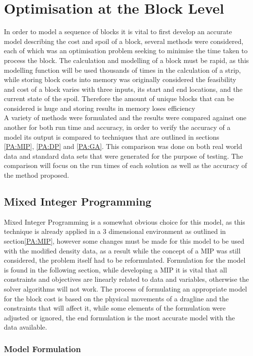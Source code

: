 \section{Optimisation at the Block Level}
In order to model a sequence of blocks it is vital to first develop an accurate model describing the cost and spoil of a block, several methods were considered, each of which was an optimisation problem seeking to minimise the time taken to process the block. The calculation and modelling of a block must be rapid, as this modelling function will be used thousands of times in the calculation of a strip, while storing block costs into memory was originally considered the feasibility and cost of a block varies with three inputs, its start and end locations, and the current state of the spoil. Therefore the amount of unique blocks that can be considered is huge and storing results in memory loses efficiency \\A variety of methods were formulated and the results were compared against one another for both run time and accuracy, in order to verify the accuracy of a model its output is compared to techniques that are outlined in sections \ref{PA:MIP}, \ref{PA:DP} and \ref{PA:GA}. This comparison was done on both real world data and standard data sets that were generated for the purpose of testing. The comparison will focus on the run times of each solution as well as the accuracy of the method proposed. 

\subsection{Mixed Integer Programming}
Mixed Integer Programming is a somewhat obvious choice for this model, as this technique is already applied in a 3 dimensional environment as outlined in section\ref{PA:MIP}, however some changes must be made for this model to be used with the modified density data, as a result while the concept of a MIP was still considered, the problem itself had to be reformulated. Formulation for the model is found in the following section, while developing a MIP it is vital that all constraints and objectives are linearly related to data and variables, otherwise the solver algorithms will not work. The process of formulating an appropriate model for the block cost is based on the physical movements of a dragline and the constraints that will affect it, while some elements of the formulation were adjusted or ignored, the end formulation is the most accurate model with the data available. 
\subsubsection{Model Formulation} 
